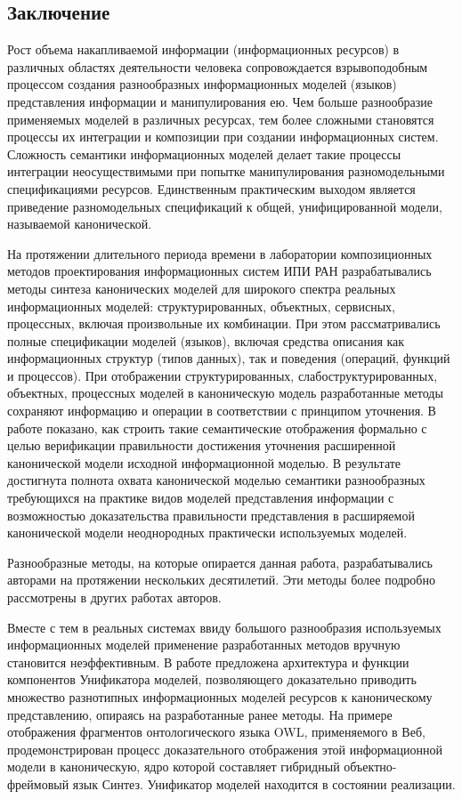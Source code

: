 \begin{multicols}{2}
\section{Заключение}

Рост объема накапливаемой информации (информационных ресурсов) в
различных областях деятельности человека сопровождается взрывоподобным
процессом создания разнообразных информационных моделей (языков)
представления информации и манипулирования ею. Чем больше разнообразие
применяемых моделей в различных ресурсах, тем более сложными
становятся процессы их интеграции и композиции при создании
информационных систем. Сложность семантики информационных
моделей делает такие процессы интеграции неосуществимыми при
попытке манипулирования разномодельными спецификациями ресурсов.
Единственным практическим выходом является приведение разномодельных
спецификаций к общей, унифицированной модели, называемой канонической.

На протяжении длительного периода времени в лаборатории композиционных
методов проектирования информационных систем ИПИ РАН разрабатывались
методы синтеза канонических моделей для широкого спектра реальных
информационных моделей: структурированных, объектных, сервисных,
процессных, включая произвольные их комбинации. При этом
рассматривались полные спецификации моделей (языков), включая средства
описания как информационных структур (типов данных), так и поведения
(операций, функций и процессов). При отображении структурированных,
слабоструктурированных, объектных, процессных моделей в каноническую
модель разработанные методы сохраняют информацию и операции в
соответствии с принципом уточнения. В работе показано, как строить
такие семантические отображения формально с целью верификации
правильности достижения уточнения расширенной канонической модели
исходной информационной моделью. В результате достигнута полнота
охвата канонической моделью семантики разнообразных требующихся на
практике видов моделей представления информации с возможностью доказательства
пра\-виль\-ности представления в расширяемой канонической модели
неоднородных практически используемых моделей.

Разнообразные методы,
на которые опирается данная работа, разрабатывались авторами на
протяжении нескольких десятилетий. Эти методы более подробно
рассмотрены в других работах ав\-торов.
{

}

Вместе с тем в реальных системах ввиду большого разнообразия
используемых информационных моделей применение разработанных методов
вручную становится неэффективным. В работе предложена архитектура и
функции компонентов Унификатора моделей, позволяющего доказательно\linebreak
приводить множество разнотипных информационных моделей ресурсов к
каноническому представлению, опираясь на разработанные ранее методы.
На примере отображения фрагментов онтологического языка OWL,
применяемого в Веб, продемонстрирован процесс доказательного
отображения этой информационной модели в каноническую, ядро которой
составляет гибридный объектно-фреймовый язык Синтез. Унификатор
моделей находится в состоянии реализации.



\end{multicols}
